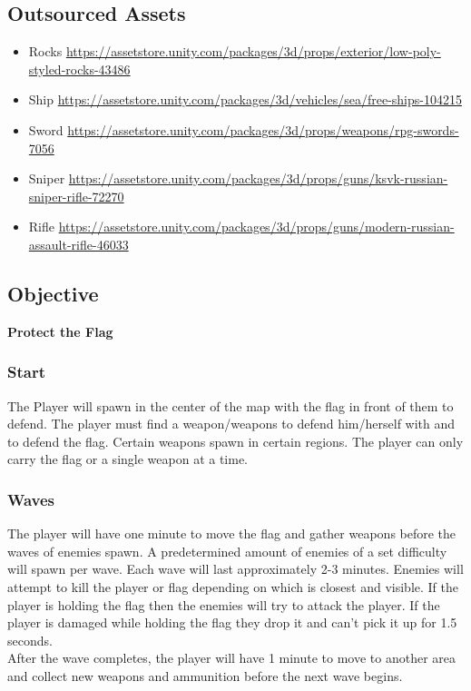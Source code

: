 \documentclass{article}
\begin{document}
\subsection{Outsourced Assets}
\begin{itemize}
\item Rocks \url{https://assetstore.unity.com/packages/3d/props/exterior/low-poly-styled-rocks-43486}
\item Ship \url{https://assetstore.unity.com/packages/3d/vehicles/sea/free-ships-104215}
\item Sword
\url{https://assetstore.unity.com/packages/3d/props/weapons/rpg-swords-7056}
\item Sniper
\url{https://assetstore.unity.com/packages/3d/props/guns/ksvk-russian-sniper-rifle-72270}
\item Rifle
\url{https://assetstore.unity.com/packages/3d/props/guns/modern-russian-assault-rifle-46033}
\end{itemize}
\subsection{Objective}
\textbf{Protect the Flag}

\subsubsection{Start}
The Player will spawn in the center of the map with the flag in front of them to defend. The player must find a weapon/weapons to defend him/herself with and to defend the flag. Certain weapons spawn in certain regions. The player can only carry the flag or a single weapon at a time.

\subsubsection{Waves}
The player will have one minute to move the flag and gather weapons before the waves of enemies spawn. A predetermined amount of enemies of a set difficulty will spawn per wave. Each wave will last approximately 2-3 minutes. Enemies will attempt to kill the player or flag depending on which is closest and visible. If the player is holding the flag then the enemies will try to attack the player. If the player is damaged while holding the flag they drop it and can't pick it up for 1.5 seconds.\\

After the wave completes, the player will have 1 minute to move to another area and collect new weapons and ammunition before the next wave begins.
\end{document}
